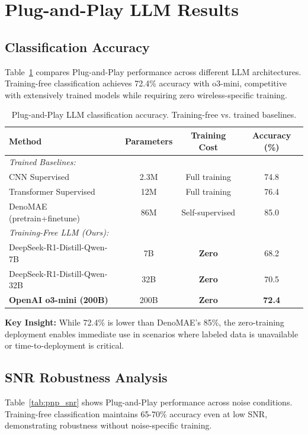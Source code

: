 \section{Plug-and-Play LLM Results}
\label{res:pnp}

\subsection{Classification Accuracy}
Table~\ref{tab:pnp_performance} compares Plug-and-Play performance across different LLM architectures. Training-free classification achieves 72.4\% accuracy with o3-mini, competitive with extensively trained models while requiring zero wireless-specific training.

\begin{table}[ht]
\centering
\caption{Plug-and-Play LLM classification accuracy. Training-free vs. trained baselines.}
\label{tab:pnp_performance}
\begin{tabular}{lccc}
\toprule
\textbf{Method} & \textbf{Parameters} & \textbf{Training Cost} & \textbf{Accuracy (\%)} \\
\midrule
\multicolumn{4}{l}{\textit{Trained Baselines:}} \\
CNN Supervised & 2.3M & Full training & 74.8 \\
Transformer Supervised & 12M & Full training & 76.4 \\
DenoMAE (pretrain+finetune) & 86M & Self-supervised & 85.0 \\
\midrule
\multicolumn{4}{l}{\textit{Training-Free LLM (Ours):}} \\
DeepSeek-R1-Distill-Qwen-7B & 7B & \textbf{Zero} & 68.2 \\
DeepSeek-R1-Distill-Qwen-32B & 32B & \textbf{Zero} & 70.5 \\
\textbf{OpenAI o3-mini (200B)} & 200B & \textbf{Zero} & \textbf{72.4} \\
\bottomrule
\end{tabular}
\end{table}

\textbf{Key Insight:} While 72.4\% is lower than DenoMAE's 85\%, the zero-training deployment enables immediate use in scenarios where labeled data is unavailable or time-to-deployment is critical.

\subsection{SNR Robustness Analysis}
Table~\ref{tab:pnp_snr} shows Plug-and-Play performance across noise conditions. Training-free classification maintains 65-70\% accuracy even at low SNR, demonstrating robustness without noise-specific training.

